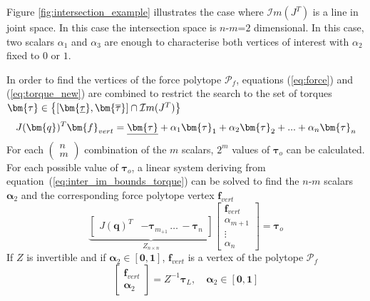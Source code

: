 Figure \ref{fig:intersection_example} illustrates the case where $\mathcal{I}m(J^T)$ is a line in joint space. In this case the intersection space is $n$-$m$=$2$ dimensional. In this case, two scalars $\alpha_1$ and $\alpha_3$ are enough to characterise both vertices of interest with $\alpha_2$ fixed to $0$ or $1$.

In order to find the vertices of the force polytope $\mathcal{P}_f$, equations (\ref{eq:force}) and (\ref{eq:torque_new}) are combined to restrict the search to the set of torques $\bm{\tau} \in \left\{[\bm{\unum{\tau}},\bm{\onum{\tau}}] \cap \mathcal{I}m(J^T)\right\}$
\begin{equation}
    J(\bm{q})^T \bm{f}_{vert} = \unum{\bm{\tau}} + \alpha_1 \bm{\tau}_1+ \alpha_2 \bm{\tau}_2 + ... + \alpha_n \bm{\tau}_n \label{eq:inter_im_bounds_torque}
\end{equation}
For each $\left(\begin{smallmatrix}n\\m\end{smallmatrix}\right)$ combination of the $m$ scalars, $2^m$ values of $\bm{\tau}_o$ can be calculated. For each possible value of $\bm{\tau}_o$, a linear system deriving from equation~(\ref{eq:inter_im_bounds_torque}) can be solved to find the $n$-$m$ scalars $\bm{\alpha}_{2}$ and the corresponding force polytope vertex $\bm{f}_{vert}$
\begin{equation}
    \underbrace{\begin{bmatrix}J(\bm{q})^T&-\bm{\tau}_{m}_{+1} \, \dots \, -\bm{\tau}_{n} \end{bmatrix}}_{Z_{n\times n}} \begin{bmatrix}\bm{f}_{vert}\\ \alpha_{m+1} \\ \vdots\\\alpha_{n} \end{bmatrix} = \bm{\tau}_o
    \label{eq:linear_system_full}
\end{equation}
If $Z$ is invertible and if $\bm{\alpha}_2 \in [\bm{0},\bm{1}]$, $\bm{f}_{vert}$ is a vertex of the polytope $\mathcal{P}_f$
\begin{equation}
   \begin{bmatrix}\bm{f}_{vert}\\ \bm{\alpha}_{2} \end{bmatrix} = Z^{-1}\bm{\tau}_L, \quad  \bm{\alpha}_{2} \in [\bm{0},\bm{1}]
    \label{eq:linear_system_full_solution}
\end{equation}

